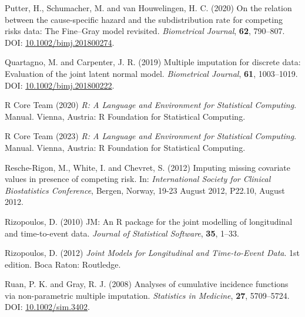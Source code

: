 \documentclass[
  letterpaper,
  DIV=11,
  numbers=noendperiod]{scrreprt}
\newlength{\cslhangindent}
\newlength{\cslentryspacingunit} %
\newenvironment{CSLReferences}[2] %
 {%
  \setlength{\parindent}{0pt}
  \ifodd #1
  \let\oldpar\par
  \def\par{\hangindent=\cslhangindent\oldpar}
  \fi
  \setlength{\parskip}{#2\cslentryspacingunit}
 }%
 {}
\begin{document}
\begin{CSLReferences}{1}{0}
\leavevmode{}%
Putter, H., Schumacher, M. and van Houwelingen, H. C. (2020) On the
relation between the cause-specific hazard and the subdistribution rate
for competing risks data: {The Fine}--{Gray} model revisited.
\emph{Biometrical Journal}, \textbf{62}, 790--807. DOI:
\href{https://doi.org/10.1002/bimj.201800274}{10.1002/bimj.201800274}.

\leavevmode{}%
Quartagno, M. and Carpenter, J. R. (2019) Multiple imputation for
discrete data: {Evaluation} of the joint latent normal model.
\emph{Biometrical Journal}, \textbf{61}, 1003--1019. DOI:
\href{https://doi.org/10.1002/bimj.201800222}{10.1002/bimj.201800222}.

\leavevmode{}%
R Core Team (2020) \emph{R: {A} Language and Environment for Statistical
Computing}. Manual. Vienna, Austria: R Foundation for Statistical
Computing.

\leavevmode{}%
R Core Team (2023) \emph{R: {A} Language and Environment for Statistical
Computing}. Manual. Vienna, Austria: R Foundation for Statistical
Computing.

\leavevmode{}%
Resche-Rigon, M., White, I. and Chevret, S. (2012) Imputing missing
covariate values in presence of competing risk. In: \emph{International
{Society} for {Clinical Biostatistics Conference}}, Bergen, Norway,
19-23 August 2012, P22.10, August 2012.

\leavevmode{}%
Rizopoulos, D. (2010) {JM}: {An R} package for the joint modelling of
longitudinal and time-to-event data. \emph{Journal of Statistical
Software}, \textbf{35}, 1--33.

\leavevmode{}%
Rizopoulos, D. (2012) \emph{Joint {Models} for {Longitudinal} and
{Time-to-Event Data}}. 1st edition. Boca Raton: Routledge.

\leavevmode{}%
Ruan, P. K. and Gray, R. J. (2008) Analyses of cumulative incidence
functions via non-parametric multiple imputation. \emph{Statistics in
Medicine}, \textbf{27}, 5709--5724. DOI:
\href{https://doi.org/10.1002/sim.3402}{10.1002/sim.3402}.


\end{CSLReferences}
\end{document}
